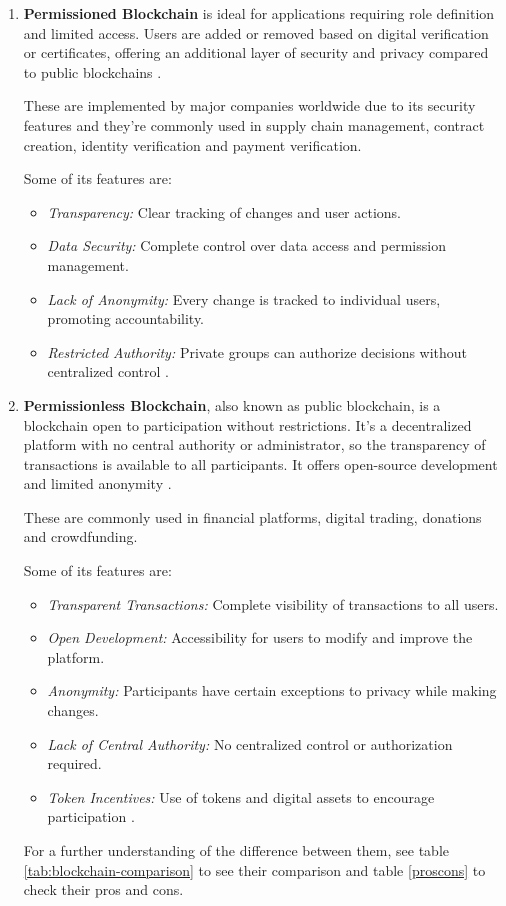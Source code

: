 \begin{enumerate}
    \item \textbf{Permissioned Blockchain} is ideal for applications requiring role definition and limited access. Users are added or removed based on digital verification or certificates, offering an additional layer of security and privacy compared to public blockchains \cite{bc_types, perm_bc}.

These are implemented by major companies worldwide due to its security features and they're commonly used in supply chain management, contract creation, identity verification and payment verification.

Some of its features are:

\begin{itemize}
    \item \textit{Transparency:} Clear tracking of changes and user actions.
    \item \textit{Data Security:} Complete control over data access and permission management.
    \item \textit{Lack of Anonymity:} Every change is tracked to individual users, promoting accountability.
    \item \textit{Restricted Authority:} Private groups can authorize decisions without centralized control \cite{perm_bc}.
\end{itemize}

    \item \textbf{Permissionless Blockchain}, also known as public blockchain, is a blockchain open to participation without restrictions. It's a decentralized platform with no central authority or administrator, so the transparency of transactions is available to all participants.
It offers open-source development and limited anonymity \cite{bc_types, perm_bc}.


These are commonly used in financial platforms, digital trading, donations and crowdfunding.\newline

Some of its features are:

\begin{itemize}
    \item \textit{Transparent Transactions:} Complete visibility of transactions to all users.
    \item \textit{Open Development:} Accessibility for users to modify and improve the platform.
    \item \textit{Anonymity:} Participants have certain exceptions to privacy while making changes.
    \item \textit{Lack of Central Authority:} No centralized control or authorization required.
    \item \textit{Token Incentives:} Use of tokens and digital assets to encourage participation \cite{perm_bc}.
\end{itemize}

For a further understanding of the difference between them, see table \ref{tab:blockchain-comparison} to see their comparison and table \ref{proscons} to check their pros and cons.\newline
\end{enumerate}


